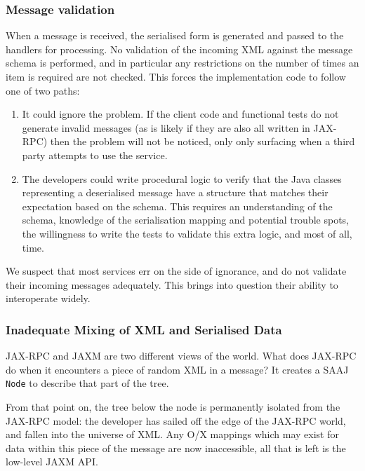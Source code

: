 \subsubsection{Message validation}
\label{objections:o-x:validation}

When a message is received, the serialised form is generated and
passed to the handlers for processing. No validation of the incoming
XML against the message schema is performed, and in particular any
restrictions on the number of times an item is required are not
checked. This forces the implementation code to follow one of two
paths:
\begin{enumerate}

\item It could ignore the problem. If the client code and functional
tests do not generate invalid messages (as is likely if they are also
all written in JAX-RPC) then the problem will not be noticed, only
only surfacing when a third party attempts to use the service.

\item The developers could write procedural logic to verify that
the Java classes representing a deserialised message have a
structure that matches their expectation based on the schema. This
requires an understanding of the schema, knowledge of the
serialisation mapping and potential trouble spots, the willingness to
write the tests to validate this extra logic, and most of all, time.

\end{enumerate}

We suspect that most services err on the side of ignorance, and do not
validate their incoming messages adequately. This brings into question
their ability to interoperate widely.

\subsubsection{Inadequate Mixing of XML and Serialised Data}
\label{objections:o-x:mixing}

JAX-RPC and JAXM are two different views of the world. What does JAX-RPC
do when it encounters a piece of random XML in a message? It creates a
SAAJ {\tt Node} to describe that part of the tree.

From that point on, the tree below the node is permanently isolated
from the JAX-RPC model: the developer has sailed off the edge of the
JAX-RPC world, and fallen into the universe of XML. Any O/X mappings
which may exist for data within this piece of the message are now
inaccessible, all that is left is the low-level JAXM API. 

